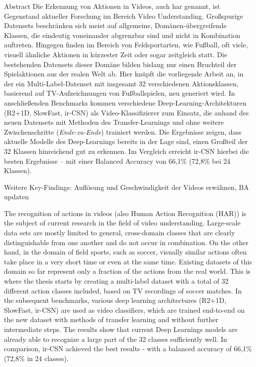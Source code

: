 \newcommand{\primarymetric}{66,1}
\newcommand{\secondarymetric}{72,8}

\begin{prefacesection}{Abstract}
    Die Erkennung von Aktionen in Videos, auch \gls{har} genannt, ist Gegenstand aktueller Forschung im Bereich Video Understanding.
    Großspurige Datensets beschränken sich meist auf allgemeine, Domänen-übergreifende Klassen, die eindeutig voneinander abgrenzbar sind und nicht in Kombination auftreten.
    Hingegen finden im Bereich von Feldsportarten, wie Fußball, oft viele, visuell ähnliche Aktionen in kürzester Zeit oder sogar zeitgleich statt.
    Die bestehenden Datensets dieser Domäne bilden bislang nur einen Bruchteil der Spielaktionen aus der realen Welt ab.
    Hier knüpft die vorliegende Arbeit an, in der ein Multi-Label-Datenset mit insgesamt 32 verschiedenen Aktionsklassen, basierend auf TV-Aufzeichnungen von Fußballspielen, neu generiert wird.
    In anschließenden Benchmarks kommen verschiedene Deep-Learning-Architekturen (R2+1D, SlowFast, ir-CSN) als Video-Klassifizierer zum Einsatz, die anhand des neuen Datensets mit Methoden des Transfer-Learnings und ohne weitere Zwischenschritte (\emph{Ende-zu-Ende}) trainiert werden.
    Die Ergebnisse zeigen, dass aktuelle Modelle des Deep-Learnings bereits in der Lage sind, einen Großteil der 32 Klassen hinreichend gut zu erkennen.
    Im Vergleich erreicht ir-CSN hierbei die besten Ergebnisse -- mit einer Balanced Accuracy von \primarymetric \% (\secondarymetric \% bei 24 Klassen).

    \begin{tcolorbox}[title=WIP]
        Weitere Key-Findings: Auflösung und Geschwindigkeit der Videos erwähnen, BA updaten
    \end{tcolorbox}

    The recognition of actions in videos (also Human Action Recognition (HAR)) is the subject of current research in the field of video understanding.
    Large-scale data sets are mostly limited to general, cross-domain classes that are clearly distinguishable from one another and do not occur in combination.
    On the other hand, in the domain of field sports, such as soccer, visually similar actions often take place in a very short time or even at the same time.
    Existing datasets of this domain so far represent only a fraction of the actions from the real world.
    This is where the thesis starts by creating a multi-label dataset with a total of 32 different action classes included, based on TV recordings of soccer matches.
    In the subsequent benchmarks, various deep learning architectures (R2+1D, SlowFast, ir-CSN) are used as video classifiers, which are trained end-to-end on the new dataset with methods of transfer learning and without further intermediate steps.
    The results show that current Deep Learnings models are already able to recognize a large part of the 32 classes sufficiently well.
    In comparison, ir-CSN achieved the best results - with a balanced accuracy of \primarymetric \% (\secondarymetric \% in 24 classes).

\end{prefacesection}
